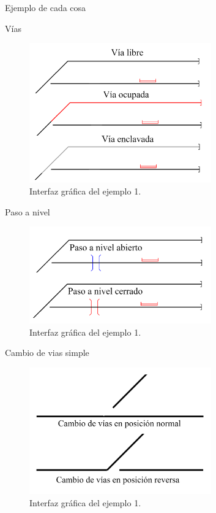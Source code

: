 	Ejemplo de cada cosa
	
	Vías
	
	\begin{figure}[H]
		\centering
		\includegraphics[width=0.7\textwidth]{AGG/images/AGG_via}
		\centering\caption{Interfaz gráfica del ejemplo 1.}
		\label{fig:AGG_tracks}
	\end{figure}
	
	Paso a nivel
	
	\begin{figure}[H]
		\centering
		\includegraphics[width=0.7\textwidth]{AGG/images/AGG_cruce}
		\centering\caption{Interfaz gráfica del ejemplo 1.}
		\label{fig:AGG_levelCrossing}
	\end{figure}
	
	
	
	Cambio de vias simple
	
	\begin{figure}[H]
		\centering
		\includegraphics[width=0.7\textwidth]{AGG/images/AGG_switch}
		\centering\caption{Interfaz gráfica del ejemplo 1.}
		\label{fig:AGG_switch}
	\end{figure}

